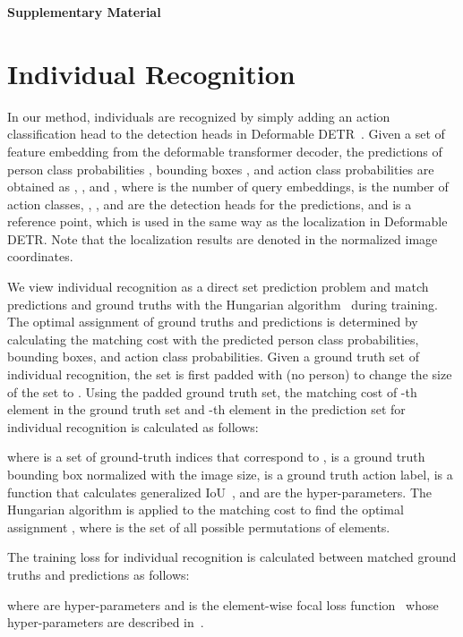 \documentclass[runningheads]{llncs}
\begin{document}
\clearpage

\centerline{\Large \bfseries\boldmath Supplementary Material}

\section{Individual Recognition}

In our method, individuals are recognized by simply adding an action classification head to the detection heads in Deformable DETR~\cite{zhu_iclr2021}. Given a set of feature embedding  from the deformable transformer decoder, the predictions of person class probabilities , bounding boxes , and action class probabilities  are obtained as , , and , where  is the number of query embeddings,  is the number of action classes, , , and  are the detection heads for the predictions, and  is a reference point, which is used in the same way as the localization in Deformable DETR. Note that the localization results are denoted in the normalized image coordinates. 

We view individual recognition as a direct set prediction problem and match predictions and ground truths with the Hungarian algorithm~\cite{kuhn_naval1955} during training. The optimal assignment of ground truths and predictions is determined by calculating the matching cost with the predicted person class probabilities, bounding boxes, and action class probabilities. Given a ground truth set of individual recognition, the set is first padded with  (no person) to change the size of the set to . Using the padded ground truth set, the matching cost of -th element in the ground truth set and -th element in the prediction set for individual recognition is calculated as follows:

where  is a set of ground-truth indices that correspond to ,  is a ground truth bounding box normalized with the image size,  is a ground truth action label,  is a function that calculates generalized IoU~\cite{rezatofighi_cvpr2019}, and  are the hyper-parameters. The Hungarian algorithm is applied to the matching cost to find the optimal assignment , where  is the set of all possible permutations of  elements.

The training loss for individual recognition  is calculated between matched ground truths and predictions as follows:

where  are hyper-parameters and  is the element-wise focal loss function~\cite{lin_iccv2017} whose hyper-parameters are described in~\cite{zhou_arxiv2019}.
\end{document}
